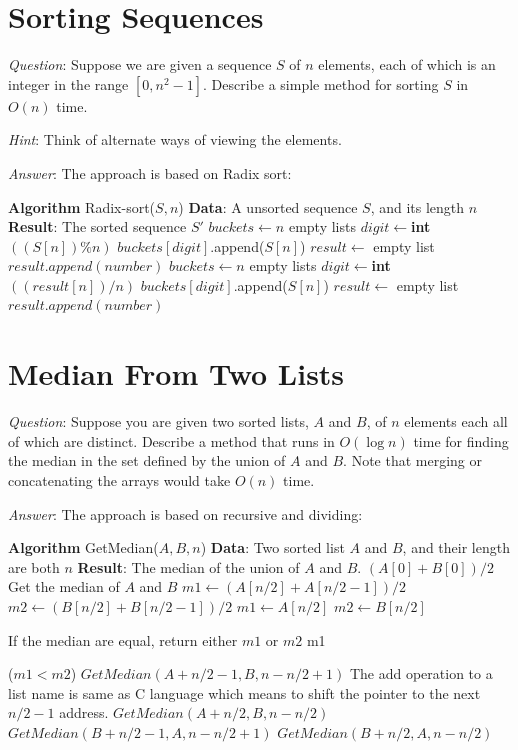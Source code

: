 \documentclass[11pt]{article}
\begin{document}
\section{Sorting Sequences}
\noindent \emph{Question}: Suppose we are given a sequence $S$ of $n$ elements, each of which is an integer in the range $[0,n^2-1]$. Describe a simple method for sorting $S$ in $O(n)$ time.

\noindent \emph{Hint}: Think of alternate ways of viewing the elements.

\noindent \emph{Answer}: The approach is based on Radix sort:
\begin{algorithmic}
	\State \textbf{Algorithm} Radix-sort($S,n$)
	\State \textbf{Data}: A unsorted sequence $S$, and its length $n$
	\State \textbf{Result}: The sorted sequence $S'$
	\State $buckets \gets n $ empty lists
	\State $digit \gets $\textbf{int}$((S[n])\%n)$
	\State $buckets[digit]$.append($S[n]$)
	\EndFor
	\State $result\gets$ empty list
			\State $result.append(number)$
		\EndFor
	\EndFor
	\State $buckets \gets n $ empty lists
	\State $digit \gets $\textbf{int}$((result[n])/n)$
	\State $buckets[digit]$.append($S[n]$)
	\EndFor
	\State $result\gets$ empty list
			\State $result.append(number)$
		\EndFor
	\EndFor
\end{algorithmic}
\section{Median From Two Lists}
\noindent \emph{Question}: Suppose you are given two sorted lists, $A$ and $B$, of $n$ elements each all of which are distinct. Describe a method that runs in $O(\log n)$ time for finding the median in the set defined by the union of $A$ and $B$. Note that merging or concatenating the arrays would take $O(n)$ time.

\noindent \emph{Answer}: The approach is based on recursive and dividing:
\begin{algorithmic}
	\State \textbf{Algorithm} GetMedian($A,B,n$)
	\State \textbf{Data}: Two sorted list $A$ and $B$, and their length are both $n$
	\State \textbf{Result}: The median of the union of $A$ and $B$.
		\State \Return $(A[0]+B[0])/2$
	\EndIf
	 \Comment Get the median of $A$ and $B$
		\State $m1\gets (A[n/2]+A[n/2-1])/2$
		\State $m2\gets (B[n/2]+B[n/2-1])/2$
	\Else
		\State $m1\gets A[n/2]$
		\State $m2\gets B[n/2]$
	\EndIf
	
	 \Comment If the median are equal, return either $m1$ or $m2$
		\State \Return m1
	\EndIf
	
	\If($m1 < m2$)
			\State \Return $GetMedian(A+n/2-1,B,n-n/2+1)$ \Comment The add operation to a list name is same as C language which means to shift the pointer to the next $n/2-1$ address.
		\Else
			\State \Return $GetMedian(A+n/2,B,n-n/2)$
		\EndIf
	\Else
			\State \Return $GetMedian(B+n/2-1,A,n-n/2+1)$
		\Else
			\State \Return $GetMedian(B+n/2,A,n-n/2)$
		\EndIf
	\EndIf
\end{algorithmic}
\end{document}
